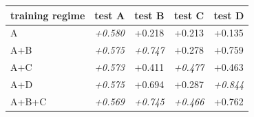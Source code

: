 \begin{tabular}{lcccc}
\toprule
training regime & test A & test B & test C & test D \\
\midrule
A & \emph{+0.580} & +0.218 & +0.213 & +0.135 \\
A+B & \emph{+0.575} & \emph{+0.747} & +0.278 & +0.759 \\
A+C & \emph{+0.573} & +0.411 & \emph{+0.477} & +0.463 \\
A+D & \emph{+0.575} & +0.694 & +0.287 & \emph{+0.844} \\
A+B+C & \emph{+0.569} & \emph{+0.745} & \emph{+0.466} & +0.762 \\
\bottomrule
\end{tabular}